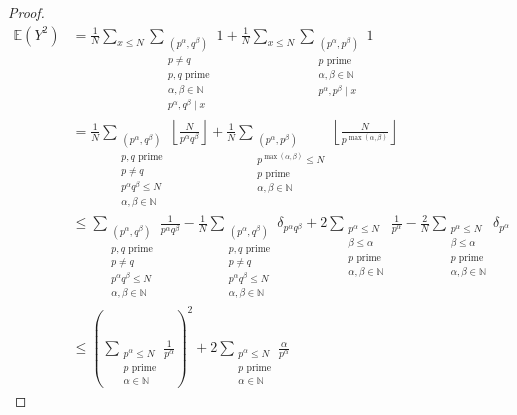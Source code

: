 \documentclass[12pt,reqno]{amsart}
\begin{document}
\begin{proof}
\begin{align*}
    \mathbb{E} \left( Y^{2} \right) & = \frac{1}{N} \sum _{x \leq N} \sum _{\substack{ (p^{\alpha},q^{\beta})\\ p \neq q \\ p,q \text{ prime} \\ \alpha , \beta \in \mathbb{N} \\ p ^{\alpha}, q^{\beta} \mid x }} 1 + \frac{1}{N} \sum _{x \leq N} \sum _{\substack{ (p^{\alpha},p^{\beta}) \\ p \text{ prime} \\ \alpha , \beta \in \mathbb{N} \\ p ^{\alpha}, p^{\beta} \mid x }} 1\\
    & = \frac{1}{N} \sum _{\substack{ \left( p ^{\alpha} ,q^{\beta} \right) \\ p,q \text{ prime} \\ p \neq q \\ p^{\alpha}q^{\beta} \leq N \\ \alpha,\beta \in \mathbb{N}  }} \left\lfloor \frac{N}{p ^{\alpha} q ^{\beta}}  \right\rfloor + \frac{1}{N} \sum _{\substack{ (p ^{\alpha}, p ^{\beta}) \\ p ^{ \max \left( \alpha,\beta \right) }\leq N \\ p \text{ prime} \\ \alpha, \beta \in \mathbb{N}  }} \left\lfloor \frac{N}{p ^{\max \left( \alpha,\beta \right) }}  \right\rfloor \\
    & \leq  \sum _{\substack{ \left( p ^{\alpha} ,q^{\beta} \right) \\ p,q \text{ prime} \\ p \neq q \\ p^{\alpha}q^{\beta} \leq N \\ \alpha,\beta \in \mathbb{N}  }} \frac{1}{ p ^{\alpha} q ^{\beta}} - \frac{1}{N}  \sum _{\substack{ \left( p ^{\alpha} ,q^{\beta} \right) \\ p,q \text{ prime} \\ p \neq q \\ p^{\alpha}q^{\beta} \leq N \\ \alpha,\beta \in \mathbb{N}  }} \delta_{p ^{\alpha}q ^{\beta}} +2 \sum _{\substack{ p ^{\alpha} \leq N \\ \beta \leq \alpha\\ p \text{ prime} \\ \alpha, \beta \in \mathbb{N}  }}\frac{1}{p ^{\alpha}} - \frac{2}{N}  \sum _{\substack{ p ^{\alpha} \leq N \\ \beta \leq \alpha\\ p \text{ prime} \\ \alpha, \beta \in \mathbb{N}  }}\delta_{p ^{\alpha}}   \\
    & \leq \left( \sum _{\substack{ p ^{\alpha} \leq N \\ p \text{ prime} \\ \alpha \in \mathbb{N}  }} \frac{1}{p ^{\alpha}}  \right) ^{2} +  2 \sum _{\substack{ p ^{\alpha} \leq N \\ p \text{ prime} \\ \alpha \in  \mathbb{N} }} \frac{\alpha}{p ^{\alpha}}
\end{align*}



\end{proof}
\end{document}
